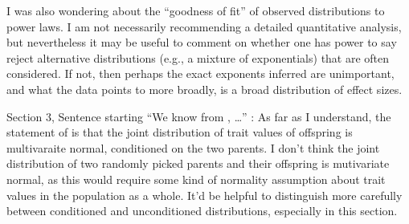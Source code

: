 
\begin{point}{}
I was also wondering about the ``goodness of fit'' of observed distributions to power laws. I am not necessarily recommending a detailed quantitative analysis, but nevertheless it may be useful to comment on whether one has power to say reject alternative distributions (e.g., a mixture of exponentials) that are often considered. If not, then perhaps the exact exponents inferred are unimportant, and what the data points to more broadly, is a broad distribution of effect sizes.
\end{point}


\begin{point}{}
    Section 3, Sentence starting ``We know from \citet{barton2017infinitesimal}, \ldots'' \revref: As far as I understand, the statement of \citet{barton2017infinitesimal} is that the joint distribution of trait values of offspring is multivaraite normal, conditioned on the two parents. I don't think the joint distribution of two randomly picked parents and their offspring is mutivariate normal, as this would require some kind of normality assumption about trait values in the population as a whole. It'd be helpful to distinguish more carefully between conditioned and unconditioned distributions, especially in this section.
\end{point}

